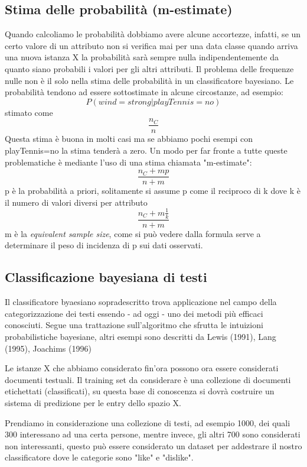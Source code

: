 \documentclass{article}
\theoremstyle{plain}
\theoremstyle{definition}
\begin{document}
\subsection{Stima delle probabilità (m-estimate)}
Quando calcoliamo le probabilità dobbiamo avere alcune accortezze, infatti, se un certo valore di un attributo non si verifica mai per una data classe quando arriva una nuova istanza X la probabilità sarà sempre nulla indipendentemente da quanto siano probabili i valori per gli altri attributi. Il problema delle frequenze nulle non è il solo nella stima delle probabilità in un classificatore bayesiano. Le probabilità tendono ad essere sottostimate in alcune circostanze, ad esempio:
$$P(wind=strong|playTennis=no)$$ stimato come $$\frac{n_C}{n}$$
Questa stima è buona in molti casi ma se abbiamo pochi esempi con playTennis=no la stima tenderà a zero.
Un modo per far fronte a tutte queste problematiche è mediante l'uso di una stima chiamata "m-estimate":
$$\frac{n_C+mp}{n+m}$$
p è la probabilità a priori, solitamente si assume p come il reciproco di k dove k è il numero di valori diversi per attributo
$$\frac{n_C+m\frac{1}{k}}{n+m}$$
m è la \textit{equivalent sample size}, come si può vedere dalla formula serve a determinare il peso di incidenza di p sui dati osservati. 

\subsection{Classificazione bayesiana di testi }
Il classificatore byaesiano sopradescritto trova applicazione nel campo della categorizzazione dei testi essendo - ad oggi - uno dei metodi più efficaci conosciuti.
Segue una trattazione sull'algoritmo che sfrutta le intuizioni probabilistiche bayesiane, altri esempi sono descritti da Lewis (1991), Lang (1995), Joachims (1996)\footnotemark
{}

Le istanze X che abbiamo considerato fin'ora possono ora essere considerati documenti testuali. Il training set da considerare è una collezione di documenti etichettati (classificati), su questa base di conoscenza si dovrà costruire un sistema di predizione per le entry dello spazio X.

Prendiamo in considerazione una collezione di testi, ad esempio 1000, dei quali 300 interessano ad una certa persone, mentre invece, gli altri 700 sono considerati non interessanti, questo può essere considerato un dataset per addestrare il nostro classificatore dove le categorie sono "like" e "dislike".
\end{document}
